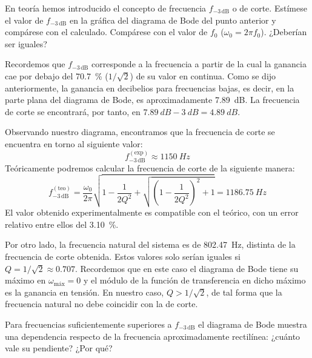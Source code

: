 \documentclass[a4paper,11pt]{article}
\begin{document}
\begin{pregunta}
En teoría hemos introducido el concepto de frecuencia $f_{-3\,\text{dB}}$ o de corte. Estímese el valor de $f_{-3\,\text{dB}}$ en la gráfica del diagrama de Bode del punto anterior y compárese con el calculado. Compárese con el valor de $f_0$ ($\omega_0=2\pi f_0$). ¿Deberían ser iguales?
\end{pregunta}

Recordemos que $f_{-3\,\text{dB}}$ corresponde a la frecuencia a partir de la cual la ganancia cae por debajo del \qty{70.7}{\percent} ($1/\sqrt2$) de su valor en continua. Como se dijo anteriormente, la ganancia en decibelios para frecuencias bajas, es decir, en la parte plana del diagrama de Bode, es aproximadamente \qty{7.89}{dB}. La frecuencia de corte se encontrará, por tanto, en $\qty{7.89}{dB}-\qty{3}{dB}=\qty{4.89}{dB}$.

Observando nuestro diagrama, encontramos que la frecuencia de corte se encuentra en torno al siguiente valor:
\begin{equation}
    f_{-3\,\text{dB}}^{(\text{exp})} \approx \qty{1150}{Hz}
\end{equation}
Teóricamente podremos calcular la frecuencia de corte de la siguiente manera:
\begin{equation}
    f_{-3\,\text{dB}}^{(\text{teo})} = \frac{\omega_0}{2\pi}\sqrt{1-\frac{1}{2Q^2}+\sqrt{\left(1-\frac{1}{2Q^2}\right)^2+1}} = \qty{1186.75}{Hz}
\end{equation}
El valor obtenido experimentalmente es compatible con el teórico, con un error relativo entre ellos del \qty{3.10}{\percent}.

Por otro lado, la frecuencia natural del sistema es de \qty{802.47}{Hz}, distinta de la frecuencia de corte obtenida. Estos valores solo serían iguales si $Q = 1/\sqrt{2}\approx \num{0.707}$. Recordemos que en este caso el diagrama de Bode tiene su máximo en $\omega_{\text{máx}}=0$ y el módulo de la función de transferencia en dicho máximo es la ganancia en tensión. En nuestro caso, $Q>1/\sqrt{2}$, de tal forma que la frecuencia natural no debe coincidir con la de corte.

\begin{pregunta}
Para frecuencias suficientemente superiores a $f_{-3\,\text{dB}}$ el diagrama de Bode muestra una dependencia respecto de la frecuencia aproximadamente rectilínea: ¿cuánto vale su pendiente? ¿Por qué?
\end{pregunta}
\end{document}
